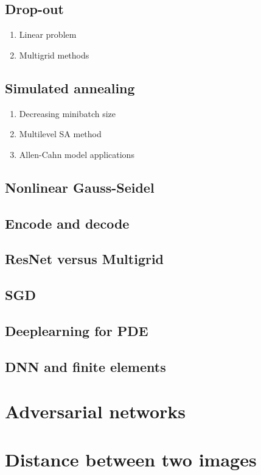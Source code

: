 \subsection{Drop-out}
\begin{enumerate}
\item Linear problem
\item Multigrid methods
\end{enumerate}

\subsection{Simulated annealing}
\begin{enumerate}
\item Decreasing minibatch size
\item Multilevel SA method
\item Allen-Cahn model applications
\end{enumerate}

\subsection{Nonlinear Gauss-Seidel}
\subsection{Encode and decode}
\subsection{ResNet versus Multigrid}
\subsection{SGD}
\subsection{Deeplearning for PDE}
\subsection{DNN and finite elements}

\section{Adversarial networks}

\section{Distance between two images}
